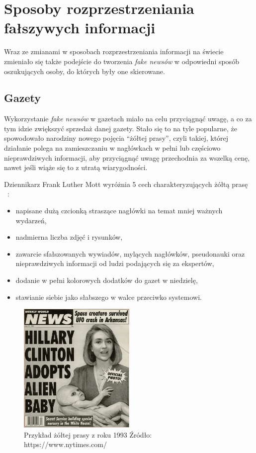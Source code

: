 \section{Sposoby rozprzestrzeniania fałszywych informacji}
Wraz ze zmianami w sposobach rozprzestrzeniania informacji na świecie zmieniało się
także podejście do tworzenia \textit{fake newsów} w odpowiedni sposób oszukujących osoby, do których 
były one skierowane. 

\subsection{Gazety}
Wykorzystanie \textit{fake newsów} w gazetach miało na celu przyciągnąć uwagę, a co za 
tym idzie zwiększyć sprzedaż danej gazety. Stało się to na tyle popularne, że spowodowało
narodziny nowego pojęcia ``żółtej prasy'', czyli takiej, której działanie polega na zamieszczaniu 
w nagłówkach w pełni lub częściowo nieprawdziwych informacji, aby przyciągnąć uwagę przechodnia 
za wszelką cenę, nawet jeśli wiąże się to z utratą wiarygodności. 

Dziennikarz Frank Luther Mott wyróżnia 5 cech charakteryzujących 
żółtą prasę ~\cite{YellowPressFrank}:
\begin{itemize}
    \item napisane dużą czcionką straszące nagłówki na temat mniej ważnych wydarzeń,
    \item nadmierna liczba zdjęć i rysunków,
    \item zawarcie sfałszowanych wywiadów, mylących nagłówków, pseudonauki oraz nieprawdziwych informacji od ludzi podających się za ekspertów,
    \item dodanie w pełni kolorowych dodatków do gazet w niedzielę,
    \item stawianie siebie jako słabszego w walce przeciwko systemowi.
\end{itemize}

\begin{figure}[h!]
    \centering
    \includegraphics[width=0.5\textwidth]{./Img/fake-newspaper.jpg}
    \caption{Przykład żółtej prasy z roku 1993 Źródło: https://www.nytimes.com/}
\end{figure}

